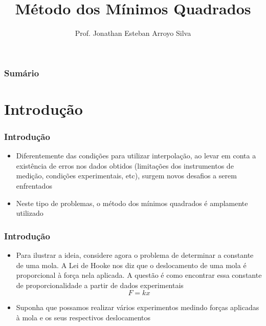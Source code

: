 \documentclass{beamer}
\title{Método dos Mínimos Quadrados}
\author
{
	Prof. Jonathan Esteban Arroyo Silva	
}
\institute
{
	Departamento de Ciência da Computação\\
	Universidade Federal de São João del-Rei\\
	\texttt{silva.jea@ufsj.edu.br}
}
\date{}
\theoremstyle{mystyle}
\begin{document}
	
\begin{frame}[plain]
    \maketitle
\end{frame}

\begin{frame}[plain]
	\frametitle{Sumário}
	\tableofcontents
\end{frame}

\section{Introdução}
	\begin{frame}
		\frametitle{Introdução}	
		\begin{itemize}
			\item Diferentemente das condições para utilizar interpolação, ao levar em conta a existência de erros nos dados obtidos (limitações dos instrumentos de medição, condições experimentais, etc), surgem novos desafios a serem enfrentados
			\item Neste tipo de problemas, o método dos mínimos quadrados é amplamente utilizado
		\end{itemize}
	\end{frame}
	
	\begin{frame}
		\frametitle{Introdução}	
		\begin{itemize}
			\item Para ilustrar a ideia, considere agora o problema de determinar a constante de uma mola. A Lei de Hooke nos diz que o deslocamento de uma mola é proporcional à força nela aplicada. A questão é como encontrar essa constante de proporcionalidade a partir de dados experimentais
			\begin{equation*}
				F = kx
			\end{equation*}
			\item Suponha que possamos realizar vários experimentos medindo forças aplicadas à mola e os seus respectivos deslocamentos
		\end{itemize}
	\end{frame}
\end{document}
